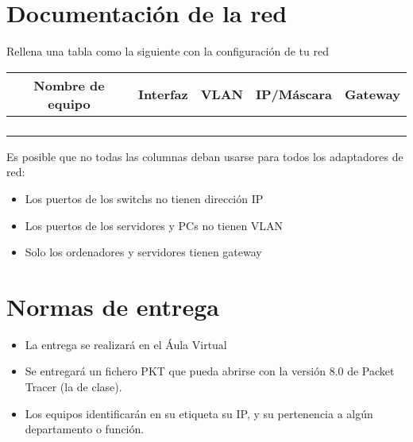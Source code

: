 \section{Documentación de la red}
Rellena una tabla como la siguiente con la configuración de tu red

\begin{center}
  \begin{tabular}{|c|c|c|c|c|}
    \hline
    Nombre de equipo & Interfaz & VLAN & IP/Máscara & Gateway\\
    \hline
                     & & & & \\
                     & & & & \\
                     & & & & \\
                     & & & & \\
    \hline
  \end{tabular}
\end{center}

Es posible que no todas las columnas deban usarse para todos los adaptadores de red:
\begin{itemize}
\item Los puertos de los switchs no tienen dirección IP
\item Los puertos de los servidores y PCs no tienen VLAN
\item Solo los ordenadores y servidores tienen gateway
  
\end{itemize}

\section{Normas de entrega}
\begin{itemize}
  
\item La entrega se realizará en el Áula Virtual
\item Se entregará un fichero PKT que pueda abrirse con la versión 8.0 de Packet Tracer (la de clase).
\item Los equipos identificarán en su etiqueta su IP, y su pertenencia a algún departamento o función.
\end{itemize}

